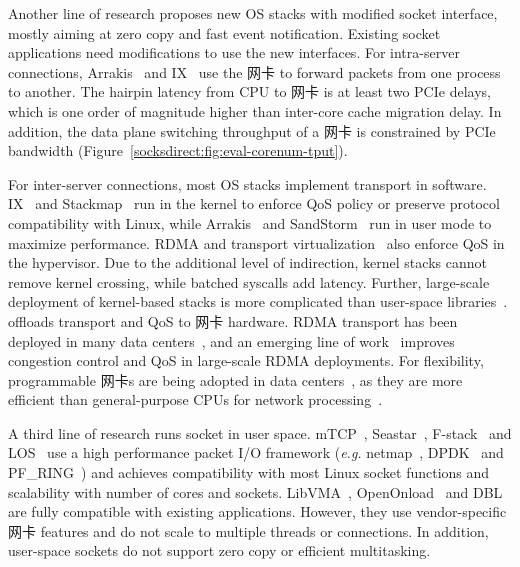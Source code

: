Another line of research proposes new OS stacks with modified socket interface, mostly aiming at zero copy and fast event notification. Existing socket applications need modifications to use the new interfaces.
For intra-server connections, Arrakis~\cite{peter2016arrakis} and IX~\cite{belay2017ix} use the 网卡 to forward packets from one process to another. The hairpin latency from CPU to 网卡 is at least two PCIe delays, which is one order of magnitude higher than inter-core cache migration delay. In addition, the data plane switching throughput of a 网卡 is constrained by PCIe bandwidth (Figure~\ref{socksdirect:fig:eval-corenum-tput}).

For inter-server connections, most OS stacks implement transport in software. IX~\cite{belay2017ix} and Stackmap~\cite{yasukata2016stackmap} run in the kernel to enforce QoS policy or preserve protocol compatibility with Linux, while Arrakis~\cite{peter2016arrakis} and SandStorm~\cite{marinos2014network} run in user mode to maximize performance.
RDMA and transport virtualization~\cite{tsai2017lite,niu2017network} also enforce QoS in the hypervisor.
Due to the additional level of indirection, kernel stacks cannot remove kernel crossing, while batched syscalls add latency.
Further, large-scale deployment of kernel-based stacks is more complicated than user-space libraries~\cite{andromeda}.
\sys offloads transport and QoS to 网卡 hardware.
RDMA transport has been deployed in many data centers~\cite{guo2016rdma}, and an emerging line of work~\cite{zhu2015congestion,lu2017memory,mprdma} improves congestion control and QoS in large-scale RDMA deployments.
For flexibility, programmable 网卡s are being adopted in data centers~\cite{smartnic,cavium}, as they are more efficient than general-purpose CPUs for network processing~\cite{kaufmann2015flexnic,li2016clicknp}.



A third line of research runs socket in user space.
mTCP~\cite{jeong2014mtcp}, Seastar~\cite{seastar}, 
F-stack~\cite{fstack} and LOS~\cite{huang2017high} use a high performance packet I/O framework (\textit{e.g.} netmap~\cite{rizzo2012netmap}, DPDK~\cite{dpdk} and PF\_RING~\cite{pf-ring}) and achieves compatibility with most Linux socket functions and scalability with number of cores and sockets.
LibVMA~\cite{libvma}, OpenOnload~\cite{openonload} and DBL~\cite{dbl} are fully compatible with existing applications. However, they use vendor-specific 网卡 features and do not scale to multiple threads or connections.
In addition, user-space sockets do not support zero copy or efficient multitasking.


